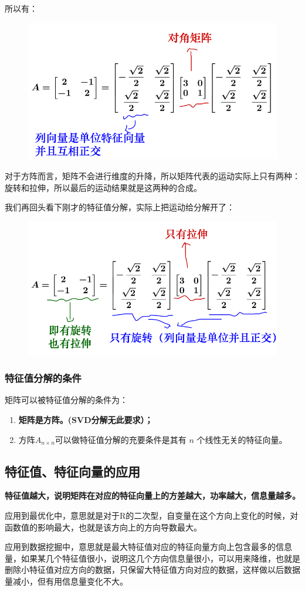 \documentclass[12pt]{article}
\begin{document}
所以有：
\begin{figure}[H]
    \centering
    \includegraphics[width=.5\textwidth]{fig/UnderstandEigenValueVector_9.png}
\end{figure} 

对于方阵而言，矩阵不会进行维度的升降，所以矩阵代表的运动实际上只有两种：旋转和拉伸，所以最后的运动结果就是这两种的合成。

我们再回头看下刚才的特征值分解，实际上把运动给分解开了：
\begin{figure}[H]
    \centering
    \includegraphics[width=.5\textwidth]{fig/UnderstandEigenValueVector_10.png}
\end{figure} 

\subsubsection{特征值分解的条件}
矩阵可以被特征值分解的条件为：
\begin{enumerate}
    \item \textbf{矩阵是方阵。(SVD分解无此要求）；}
    \item 方阵$A_{n\times n}$可以做特征值分解的充要条件是其有 $n$ 个线性无关的特征向量。
\end{enumerate}

\subsection{特征值、特征向量的应用}
\textbf{特征值越大，说明矩阵在对应的特征向量上的方差越大，功率越大，信息量越多。}

应用到最优化中，意思就是对于R的二次型，自变量在这个方向上变化的时候，对函数值的影响最大，也就是该方向上的方向导数最大。

应用到数据挖掘中，意思就是最大特征值对应的特征向量方向上包含最多的信息量，如果某几个特征值很小，说明这几个方向信息量很小，可以用来降维，也就是删除小特征值对应方向的数据，只保留大特征值方向对应的数据，这样做以后数据量减小，但有用信息量变化不大。
\end{document}
